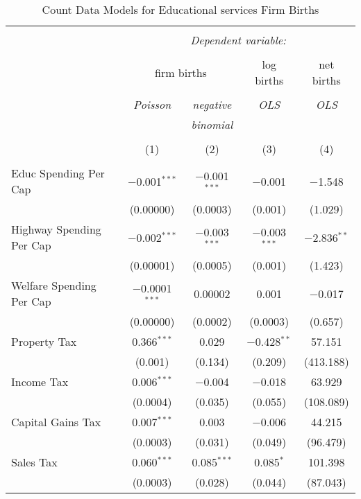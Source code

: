 
\begin{table}[!htbp] \centering 
  \caption{Count Data Models for Educational services Firm Births} 
  \label{} 
\begin{tabular}{@{\extracolsep{5pt}}lcccc} 
\\[-1.8ex]\hline 
\hline \\[-1.8ex] 
 & \multicolumn{4}{c}{\textit{Dependent variable:}} \\ 
\cline{2-5} 
\\[-1.8ex] & \multicolumn{2}{c}{firm births} & log births & net births \\ 
\\[-1.8ex] & \textit{Poisson} & \textit{negative} & \textit{OLS} & \textit{OLS} \\ 
 & \textit{} & \textit{binomial} & \textit{} & \textit{} \\ 
\\[-1.8ex] & (1) & (2) & (3) & (4)\\ 
\hline \\[-1.8ex] 
 Educ Spending Per Cap & $-$0.001$^{***}$ & $-$0.001$^{***}$ & $-$0.001 & $-$1.548 \\ 
  & (0.00000) & (0.0003) & (0.001) & (1.029) \\ 
  Highway Spending Per Cap  & $-$0.002$^{***}$ & $-$0.003$^{***}$ & $-$0.003$^{***}$ & $-$2.836$^{**}$ \\ 
  & (0.00001) & (0.0005) & (0.001) & (1.423) \\ 
  Welfare Spending Per Cap  & $-$0.0001$^{***}$ & 0.00002 & 0.001 & $-$0.017 \\ 
  & (0.00000) & (0.0002) & (0.0003) & (0.657) \\ 
  Property Tax & 0.366$^{***}$ & 0.029 & $-$0.428$^{**}$ & 57.151 \\ 
  & (0.001) & (0.134) & (0.209) & (413.188) \\ 
  Income Tax & 0.006$^{***}$ & $-$0.004 & $-$0.018 & 63.929 \\ 
  & (0.0004) & (0.035) & (0.055) & (108.089) \\ 
  Capital Gains Tax & 0.007$^{***}$ & 0.003 & $-$0.006 & 44.215 \\ 
  & (0.0003) & (0.031) & (0.049) & (96.479) \\ 
  Sales Tax & 0.060$^{***}$ & 0.085$^{***}$ & 0.085$^{*}$ & 101.398 \\ 
  & (0.0003) & (0.028) & (0.044) & (87.043) \\ 

\end{tabular}
\end{table}
